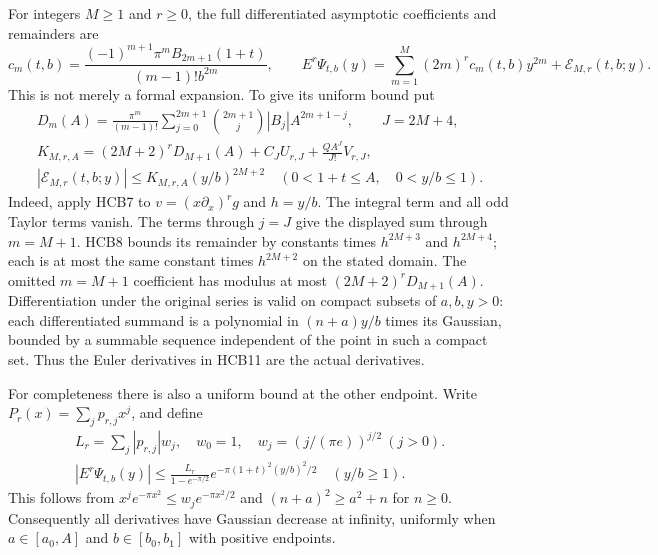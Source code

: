 For integers $M\geq1$ and $r\geq0$, the full differentiated
asymptotic coefficients and remainders are
\begin{equation}\tag{HCB11}
 c_m(t,b)=\frac{(-1)^{m+1}\pi^m B_{2m+1}(1+t)}{(m-1)!b^{2m}},
 \qquad
 E^r\Psi_{t,b}(y)=\sum_{m=1}^{M}(2m)^r c_m(t,b)y^{2m}
                       +\mathcal E_{M,r}(t,b;y).
\end{equation}
This is not merely a formal expansion. To give its uniform bound put
\begin{equation}\tag{HCB12}
\begin{gathered}
 D_m(A)=\frac{\pi^m}{(m-1)!}
       \sum_{j=0}^{2m+1}\binom{2m+1}{j}|B_j|A^{2m+1-j},
 \qquad J=2M+4,\\
 K_{M,r,A}=(2M+2)^rD_{M+1}(A)+C_JU_{r,J}
                         +\frac{QA^J}{J!}V_{r,J},\\
 |\mathcal E_{M,r}(t,b;y)|
       \leq K_{M,r,A}(y/b)^{2M+2}
 \quad(0<1+t\leq A,\quad0<y/b\leq1).
\end{gathered}
\end{equation}
Indeed, apply HCB7 to $v=(x\partial_x)^rg$ and $h=y/b$.
The integral term and all odd Taylor terms vanish. The terms through
$j=J$ give the displayed sum through $m=M+1$. HCB8 bounds its
remainder by constants times $h^{2M+3}$ and $h^{2M+4}$; each is
at most the same constant times $h^{2M+2}$ on the stated domain.
The omitted $m=M+1$ coefficient has modulus at most
$(2M+2)^rD_{M+1}(A)$. Differentiation under the original series is
valid on compact subsets of $a,b,y>0$: each differentiated summand
is a polynomial in $(n+a)y/b$ times its Gaussian, bounded by a
summable sequence independent of the point in such a compact set.
Thus the Euler derivatives in HCB11 are the actual derivatives.

For completeness there is also a uniform bound at the other endpoint.
Write $P_r(x)=\sum_jp_{r,j}x^j$, and define
\begin{equation}\tag{HCB13}
 \begin{gathered}
 L_r=\sum_j|p_{r,j}|w_j,
 \quad w_0=1,\quad w_j=(j/(\pi e))^{j/2}\ (j>0).
 \\
 |E^r\Psi_{t,b}(y)|\leq
 \frac{L_r}{1-e^{-\pi/2}}
 e^{-\pi(1+t)^2(y/b)^2/2}\quad(y/b\geq1).
 \end{gathered}
\end{equation}
This follows from
$x^je^{-\pi x^2}\leq w_je^{-\pi x^2/2}$ and
$(n+a)^2\geq a^2+n$ for $n\geq0$. Consequently all derivatives
have Gaussian decrease at infinity, uniformly when
$a\in[a_0,A]$ and $b\in[b_0,b_1]$ with positive endpoints.

